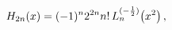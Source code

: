 \[\mathop{H_{2n}\/}\nolimits\!\left(x\right)=(-1)^{n}2^{2n}n!\mathop{L^{(-\frac{%
1}{2})}_{n}\/}\nolimits\!\left(x^{2}\right),\]